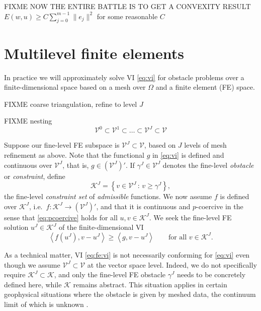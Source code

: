\documentclass[letterpaper,final,12pt,reqno]{amsart}
\theoremstyle{cstyle}
\theoremstyle{cstyle*}
\theoremstyle{dstyle}
\numberwithin{equation}{section}
\numberwithin{figure}{section}
\numberwithin{table}{section}
\numberwithin{theorem}{section}
\newcommand{\cK}{\mathcal{K}}
\newcommand{\ip}[2]{\left<#1,#2\right>}
\begin{document}
FIXME NOW THE ENTIRE BATTLE IS TO GET A CONVEXITY RESULT $E(w,u) \ge C \sum_{j=0}^{m-1} \|e_j\|^2$ for some reasonable $C$


\section{Multilevel finite elements} \label{sec:fe}

In practice we will approximately solve VI \eqref{eq:vi} for obstacle problems over a finite-dimensional space based on a mesh over $\Omega$ and a finite element (FE) space.

FIXME coarse triangulation, refine to level $J$

FIXME nesting
\begin{equation}
\mathcal{V}^0 \subset \mathcal{V}^1 \subset \dots \subset \mathcal{V}^J \subset \mathcal{V} \label{eq:fe:nestedspaces}
\end{equation}

Suppose our fine-level FE subspace is $\mathcal{V}^J \subset \mathcal{V}$, based on $J$ levels of mesh refinement as above.  Note that the functional $g$ in \eqref{eq:vi} is defined and continuous over $\mathcal{V}^J$, that is, $g\in (\mathcal{V}^J)'$.  If $\gamma^J \in \mathcal{V}^J$ denotes the fine-level \emph{obstacle} or \emph{constraint}, define
\begin{equation}
\mathcal{K}^J = \left\{v \in \mathcal{V}^J\,:\,v \ge \gamma^J\right\}, \label{eq:fineconstraintset}
\end{equation}
the fine-level \emph{constraint set} of \emph{admissible} functions.  We now assume $f$ is defined over $\mathcal{K}^J$, i.e.~$f:\mathcal{K}^J \to (\mathcal{V}^J)'$, and that it is continuous and $p$-coercive in the sense that \eqref{eq:pcoercive} holds for all $u,v \in \mathcal{K}^J$.  We seek the fine-level FE solution $u^J \in \mathcal{K}^J$ of the finite-dimensional VI
\begin{equation}
\ip{f(u^J)}{v-u^J} \ge \ip{g}{v-u^J} \qquad \text{for all } v\in \cK^J. \label{eq:fe:vi}
\end{equation}

As a technical matter, VI \eqref{eq:fe:vi} is not necessarily conforming for \eqref{eq:vi} even though we assume $\mathcal{V}^J \subset \mathcal{V}$ at the vector space level.  Indeed, we do not specifically require $\mathcal{K}^J \subset \mathcal{K}$, and only the fine-level FE obstacle $\gamma^J$ needs to be concretely defined here, while $\mathcal{K}$ remains abstract.  This situation applies in certain geophysical situations where the obstacle is given by meshed data, the continuum limit of which is unknown \cite{Bueler2016}.
\end{document}
